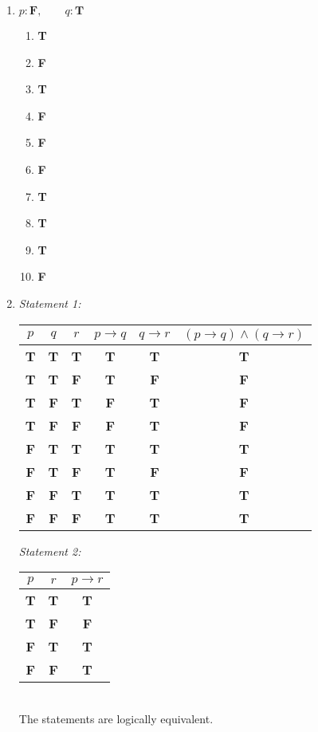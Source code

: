 \begin{enumerate}[leftmargin=2cm,labelsep=.5cm,label=\bf\arabic*.]
\item $p: \textbf{F}, \qquad q: \textbf{T}$ 
\begin{enumerate}
  \item \textbf{T}
  \item \textbf{F}
  \item \textbf{T}
  \item \textbf{F}
  \item \textbf{F}
  \item \textbf{F}
  \item \textbf{T}
  \item \textbf{T}
  \item \textbf{T}
  \item \textbf{F}\\[5mm]
\end{enumerate}

\item
\textit{Statement 1:}
\begin{tabu}[t]{|c|c|c|c|c|c|}
		\hline
		$p$ & $q$ & $r$ & $p\rightarrow q$ & $q\rightarrow r$ & $(p\rightarrow q) \wedge (q\rightarrow r)$ \\ \hline
		\textbf{T} & \textbf{T} & \textbf{T} & \textbf{T} & \textbf{T} & \textbf{T} \\ \hline
		\textbf{T} & \textbf{T} & \textbf{F} & \textbf{T} & \textbf{F} & \textbf{F} \\ \hline
		\textbf{T} & \textbf{F} & \textbf{T} & \textbf{F} & \textbf{T} & \textbf{F} \\ \hline
		\textbf{T} & \textbf{F} & \textbf{F} & \textbf{F} & \textbf{T} & \textbf{F} \\ \hline
		\textbf{F} & \textbf{T} & \textbf{T} & \textbf{T} & \textbf{T} & \textbf{T} \\ \hline
		\textbf{F} & \textbf{T} & \textbf{F} & \textbf{T} & \textbf{F} & \textbf{F} \\ \hline
		\textbf{F} & \textbf{F} & \textbf{T} & \textbf{T} & \textbf{T} & \textbf{T} \\ \hline
		\textbf{F} & \textbf{F} & \textbf{F} & \textbf{T} & \textbf{T} & \textbf{T} \\ \hline
\end{tabu}

\textit{Statement 2:}
\begin{tabu}[t]{|c|c|c|}
\hline
$p$ & $r$ & $p\rightarrow r$ \\ \hline
\textbf{T} & \textbf{T} & \textbf{T} \\ \hline
\textbf{T} & \textbf{F} & \textbf{F} \\ \hline
\textbf{F} & \textbf{T} & \textbf{T} \\ \hline
\textbf{F} & \textbf{F} & \textbf{T} \\ \hline
\end{tabu}\\[5mm]
The statements are logically equivalent.\newpage


\end{enumerate}
